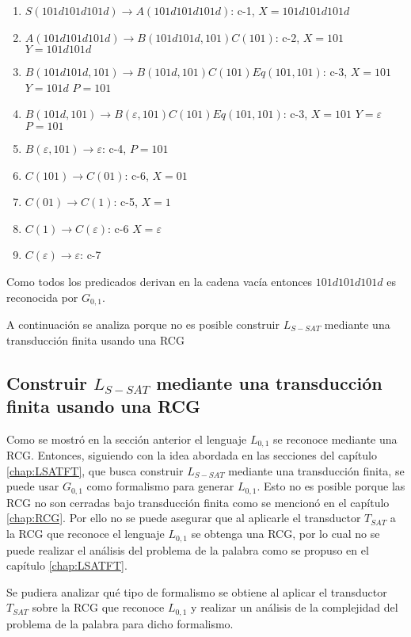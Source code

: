\begin{enumerate}
    \item $S(101d101d101d) \to A(101d101d101d)$: c-1, $X=101d101d101d$
    \item $A(101d101d101d) \to B(101d101d,101)C(101)$: c-2, $X=101$ $Y=101d101d$
    \item $B(101d101d,101) \to B(101d,101)C(101)Eq(101,101)$: c-3, $X=101$ $Y=101d$ $P=101$
    \item $B(101d,101) \to B(\varepsilon,101)C(101)Eq(101,101)$: c-3, $X=101$ $Y=\varepsilon$ $P=101$
    \item $B(\varepsilon,101) \to \varepsilon$: c-4, $P=101$
    \item $C(101)\to C(01)$: c-6, $X=01$
    \item $C(01)\to C(1)$: c-5, $X=1$
    \item $C(1)\to C(\varepsilon)$: c-6 $X=\varepsilon$
    \item $C(\varepsilon)\to \varepsilon$: c-7
\end{enumerate}

Como todos los predicados derivan en la cadena vacía entonces $101d101d101d$ es reconocida por $G_{0,1}$.

A continuación se analiza porque no es posible construir $L_{S-SAT}$ mediante una transducción finita usando
una RCG

\subsection{Construir $L_{S-SAT}$ mediante una transducción finita usando una RCG}

Como se mostró en la sección anterior el lenguaje $L_{0,1}$ se reconoce mediante una RCG.  Entonces,
siguiendo con la idea abordada en las secciones del capítulo \ref{chap:LSATFT}, que busca construir
$L_{S-SAT}$ mediante una transducción finita, se puede usar $G_{0,1}$ como formalismo para generar
$L_{0,1}$. Esto no es posible porque  las RCG no son cerradas bajo transducción finita como se mencionó en
el capítulo \ref{chap:RCG}.  Por ello no se puede asegurar que al aplicarle el transductor $T_{SAT}$
a la RCG que reconoce el lenguaje $L_{0,1}$ se obtenga una RCG, por lo cual no se puede realizar el
análisis del problema de la palabra como se propuso en el capítulo \ref{chap:LSATFT}.

Se pudiera analizar qué tipo de formalismo se obtiene al aplicar
el transductor $T_{SAT}$ sobre la RCG que reconoce $L_{0,1}$ y realizar un análisis de la complejidad del
problema de la palabra para dicho formalismo.

